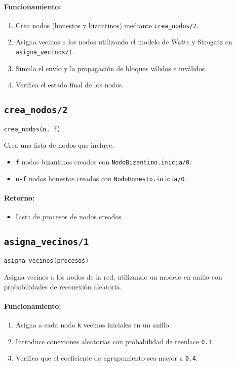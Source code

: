 {\paragraph{Funcionamiento:}
\begin{enumerate}
    \item Crea nodos (honestos y bizantinos) mediante \texttt{crea\_nodos/2}.
    \item Asigna vecinos a los nodos utilizando el modelo de Watts y Strogatz en \texttt{asigna\_vecinos/1}.
    \item Simula el envío y la propagación de bloques válidos e inválidos.
    \item Verifica el estado final de los nodos.
\end{enumerate}

\subsection*{\texttt{crea\_nodos/2}}
\begin{verbatim}
crea_nodos(n, f)
\end{verbatim}

Crea una lista de nodos que incluye:
\begin{itemize}
    \item \texttt{f} nodos bizantinos creados con \texttt{NodoBizantino.inicia/0}.
    \item \texttt{n-f} nodos honestos creados con \texttt{NodoHonesto.inicia/0}.
\end{itemize}

\paragraph{Retorno:}
\begin{itemize}
    \item Lista de procesos de nodos creados.
\end{itemize}

\subsection*{\texttt{asigna\_vecinos/1}}
\begin{verbatim}
asigna_vecinos(procesos)
\end{verbatim}

Asigna vecinos a los nodos de la red, utilizando un modelo en anillo con probabilidades de reconexión aleatoria.

\paragraph{Funcionamiento:}
\begin{enumerate}
    \item Asigna a cada nodo \texttt{k} vecinos iniciales en un anillo.
    \item Introduce conexiones aleatorias con probabilidad de reenlace \texttt{0.1}.
    \item Verifica que el coeficiente de agrupamiento sea mayor a \texttt{0.4}.
\end{enumerate}

}
